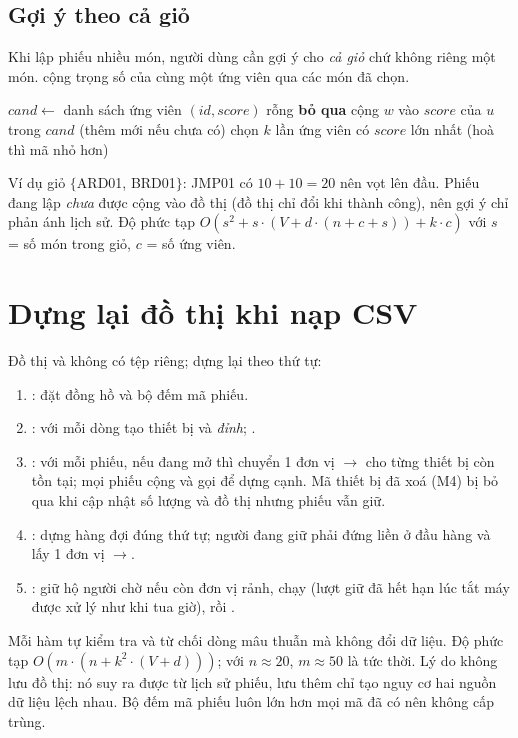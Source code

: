 \subsection{Gợi ý theo cả giỏ}
Khi lập phiếu nhiều món, người dùng cần gợi ý cho \emph{cả giỏ} chứ không riêng một món.  cộng trọng số của cùng một ứng viên qua các món đã chọn.

\begin{algorithm}[H]
\caption{\textsc{SuggestForBasket}$(basket, k)$}
\begin{algorithmic}[1]
\State $cand \gets$ danh sách ứng viên $(id, score)$ rỗng
     \textbf{bỏ qua} \EndIf
    \State cộng $w$ vào $score$ của $u$ trong $cand$ (thêm mới nếu chưa có)
  \EndFor
\EndFor
\State chọn $k$ lần ứng viên có $score$ lớn nhất (hoà thì mã nhỏ hơn) 
\end{algorithmic}
\end{algorithm}
Ví dụ giỏ $\{$ARD01, BRD01$\}$: JMP01 có $10 + 10 = 20$ nên vọt lên đầu. Phiếu đang lập \emph{chưa} được cộng vào đồ thị (đồ thị chỉ đổi khi  thành công), nên gợi ý chỉ phản ánh lịch sử. Độ phức tạp $O(s^2 + s\cdot(V + d\cdot(n + c + s)) + k\cdot c)$ với $s$ = số món trong giỏ, $c$ = số ứng viên.

\section{Dựng lại đồ thị khi nạp CSV}\label{sec:load}
Đồ thị và  không có tệp riêng;  dựng lại theo thứ tự:
\begin{enumerate}
  \item {}: đặt đồng hồ và bộ đếm mã phiếu.
  \item {}: với mỗi dòng  tạo thiết bị và \emph{đỉnh}; .
  \item {}: với mỗi phiếu, nếu đang mở thì chuyển 1 đơn vị $\to$ cho từng thiết bị còn tồn tại; mọi phiếu cộng  và gọi  để dựng cạnh. Mã thiết bị đã xoá (M4) bị bỏ qua khi cập nhật số lượng và đồ thị nhưng phiếu vẫn giữ.
  \item {}: dựng hàng đợi đúng thứ tự; người đang giữ phải đứng liền ở đầu hàng và lấy 1 đơn vị $\to$.
  \item {}: giữ hộ người chờ nếu còn đơn vị rảnh, chạy  (lượt giữ đã hết hạn lúc tắt máy được xử lý như khi tua giờ), rồi .
\end{enumerate}
Mỗi hàm  tự kiểm tra và từ chối dòng mâu thuẫn mà không đổi dữ liệu. Độ phức tạp $O(m\cdot(n + k^2\cdot(V+d)))$; với $n\approx 20$, $m\approx 50$ là tức thời. Lý do không lưu đồ thị: nó suy ra được từ lịch sử phiếu, lưu thêm chỉ tạo nguy cơ hai nguồn dữ liệu lệch nhau. Bộ đếm mã phiếu luôn lớn hơn mọi mã đã có nên không cấp trùng.

